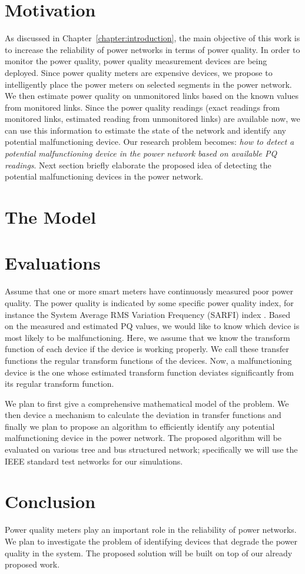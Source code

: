 \label{chap:predictionModel}
\section{Motivation}
As discussed in Chapter~\ref{chapter:introduction}, the main objective of this work is to increase the reliability of power networks in terms of power quality. In order to monitor the power quality, power quality measurement devices are being deployed. Since power quality meters are expensive devices, we propose to intelligently place the power meters on selected segments in the power network. We then estimate power quality on unmonitored links based on the known values from monitored links. Since the power quality readings (exact readings from monitored links, estimated reading from unmonitored links) are available now, we can use this information to estimate the state of the network and identify any potential malfunctioning device. Our research problem becomes: \textit{how to detect a potential malfunctioning device in the power network based on available PQ readings}. Next section briefly elaborate the proposed idea of detecting the potential malfunctioning devices in the power network.

\section{The Model}

\section{Evaluations}
Assume that one or more smart meters have continuously measured poor power quality. The power quality is indicated by some specific power quality index, for instance the System Average RMS Variation Frequency (SARFI) index . Based on the measured and estimated PQ values, we would like to know which device is most likely to be malfunctioning. Here, we assume that we know the transform function of each device if the device is working properly. We call these transfer functions the regular transform functions of the devices. Now, a malfunctioning device is the one whose estimated transform function deviates significantly from its regular transform function.

We plan to first give a comprehensive mathematical model of the problem. We then device a mechanism to calculate the deviation in transfer functions and finally we plan to propose an algorithm to efficiently identify any potential malfunctioning device in the power network. The proposed algorithm will be evaluated on various tree and bus structured network; specifically we will use the IEEE standard test networks for our simulations.

\section{Conclusion}
Power quality meters play an important role in the reliability of power networks. We plan to investigate the problem of identifying devices that degrade the power quality in the system. The proposed solution will be built on top of our already proposed work.